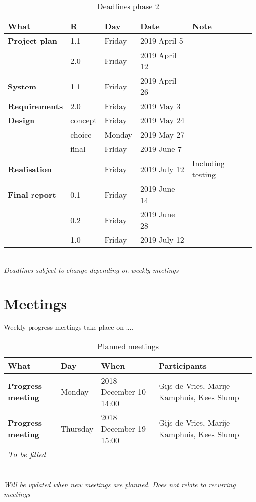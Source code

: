 \begin{table}[h!]
	\begin{tabular}{l|llll}
		\textbf{What} 		&	R	& 	Day	&	Date	&	Note \\
		\hline
		\textbf{Project plan}& 1.1	& Friday 		& 2019 April 5	&	 \\
		\rowcolor{Gray}
		 	&	2.0 	&	 Friday & 2019 April 12 & \\
		 	\hline
		\textbf{System} & 1.1 & Friday & 2019 April 26 & \\
		\rowcolor{Gray}
		\textbf{Requirements}& 2.0 & Friday & 2019 May 3 & \\
		\hline
		\textbf{Design} & concept & Friday & 2019 May 24 & \\
		\rowcolor{Gray}
		 & choice & Monday & 2019 May 27 &  \\
		 & final  & Friday & 2019 June 7 & \\
		 \rowcolor{Gray}
		 \hline
		 \textbf{Realisation} & & Friday & 2019 July 12 & Including testing\\
		 \hline
		 \textbf{Final report} & 0.1 & Friday & 2019 June 14 & \\
		 \rowcolor{Gray}
		 & 0.2 & Friday & 2019 June 28 & \\
		 & 1.0 & Friday & 2019 July 12 & \\
		 \hline
	\end{tabular} \\
	\textit{Deadlines subject to change depending on weekly meetings}
	\caption{Deadlines phase 2}
	\label{tab:deadlines2}
\end{table}

\section{Meetings}
Weekly progress meetings take place on ....

\begin{table}[h!]
	\hspace*{-1.2cm}\begin{tabular}{l|llll}
		\textbf{What} 		& 	Day	&	When	&	Participants \hfill \\
		\hline
		\textbf{Progress meeting} & Monday 		& 2018 December 10	14:00 &	 Gijs de Vries, Marije Kamphuis, Kees Slump\\
		\rowcolor{Gray}
		 \textbf{Progress meeting} & Thursday 	& 2018 December 19	15:00 &	 Gijs de Vries, Marije Kamphuis, Kees Slump\\
		 \textit{To be filled}\\
		 \hline
	\end{tabular}\hspace*{-1.2cm} \\
	\textit{Will be updated when new meetings are planned. Does not relate to recurring meetings}
	\caption{Planned meetings}
	\label{tab:planned_meet}
\end{table}